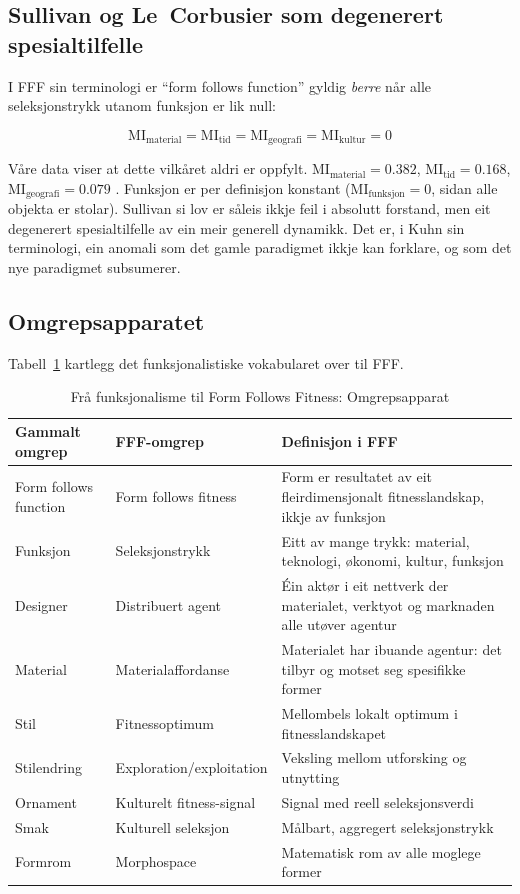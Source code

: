 \documentclass[12pt,a4paper]{article}
\begin{document}
\subsection{Sullivan og Le~Corbusier som degenerert spesialtilfelle}

I FFF sin terminologi er \enquote{form follows function} gyldig \emph{berre} n\aa{}r alle seleksjonstrykk utanom funksjon er lik null:

\begin{equation}
\mathrm{MI_{material}} = \mathrm{MI_{tid}} = \mathrm{MI_{geografi}} = \mathrm{MI_{kultur}} = 0
\end{equation}

\noindent
V\aa{}re data viser at dette vilk\aa{}ret aldri er oppfylt. $\mathrm{MI_{material}} = 0.382$, $\mathrm{MI_{tid}} = 0.168$, $\mathrm{MI_{geografi}} = 0.079$ \citep{finne2026d}. Funksjon er per definisjon konstant ($\mathrm{MI_{funksjon}} = 0$, sidan alle objekta er stolar). Sullivan si lov er s\aa{}leis ikkje feil i absolutt forstand, men eit degenerert spesialtilfelle av ein meir generell dynamikk. Det er, i Kuhn sin terminologi, ein anomali som det gamle paradigmet ikkje kan forklare, og som det nye paradigmet subsumerer.

\subsection{Omgrepsapparatet}

Tabell~\ref{tab:omgrep} kartlegg det funksjonalistiske vokabularet over til FFF.

\begin{table}[H]
\centering
\caption{Fr\aa{} funksjonalisme til Form Follows Fitness: Omgrepsapparat}
\label{tab:omgrep}
\small
\begin{tabularx}{\textwidth}{p{2.8cm}p{2.8cm}X}
\toprule
\textbf{Gammalt omgrep} & \textbf{FFF-omgrep} & \textbf{Definisjon i FFF} \\
\midrule
Form follows function & Form follows fitness & Form er resultatet av eit fleirdimensjonalt fitnesslandskap, ikkje av funksjon \\
Funksjon & Seleksjonstrykk & Eitt av mange trykk: material, teknologi, \o{}konomi, kultur, funksjon \\
Designer & Distribuert agent & \'{E}in akt\o{}r i eit nettverk der materialet, verktyot og marknaden alle ut\o{}ver agentur \\
Material & Materialaffordanse & Materialet har ibuande agentur: det tilbyr og motset seg spesifikke former \\
Stil & Fitnessoptimum & Mellombels lokalt optimum i fitnesslandskapet \\
Stilendring & Exploration/exploitation & Veksling mellom utforsking og utnytting \\
Ornament & Kulturelt fitness-signal & Signal med reell seleksjonsverdi \\
Smak & Kulturell seleksjon & M\aa{}lbart, aggregert seleksjonstrykk \\
Formrom & Morphospace & Matematisk rom av alle moglege former \\
\bottomrule
\end{tabularx}
\end{table}
\end{document}

